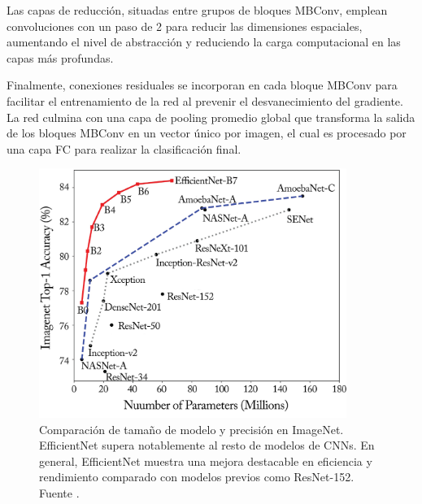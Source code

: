 Las capas de reducción, situadas entre grupos de bloques MBConv, emplean convoluciones con un paso de 2 para reducir las dimensiones espaciales, aumentando el nivel de abstracción y reduciendo la carga computacional en las capas más profundas.

Finalmente, conexiones residuales se incorporan en cada bloque MBConv para facilitar el entrenamiento de la red al prevenir el desvanecimiento del gradiente. La red culmina con una capa de pooling promedio global que transforma la salida de los bloques MBConv en un vector único por imagen, el cual es procesado por una capa FC para realizar la clasificación final.


\begin{figure}[hbt!]
	\centering
	\includegraphics[width=100mm]{img/cnn-sota.png}
	\caption{Comparación de tamaño de modelo y precisión en ImageNet. EfficientNet supera notablemente al resto de modelos de CNNs. En general, EfficientNet muestra una mejora destacable en eficiencia y rendimiento comparado con modelos previos como ResNet-152. Fuente \cite{tan2019efficientnet}.}
\end{figure}

